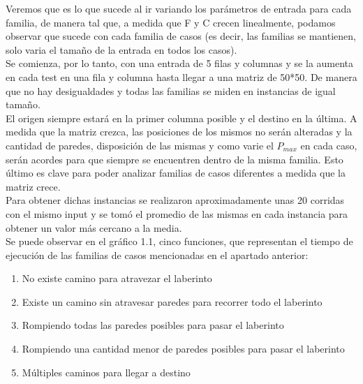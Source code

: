 \indent Veremos que es lo que sucede al ir variando los parámetros de entrada para cada familia, de manera tal que, a medida que F y C crecen linealmente, podamos observar que sucede con cada familia de casos (es decir, las familias se mantienen, solo varia el tamaño de la entrada en todos los casos).\\
Se comienza, por lo tanto, con una entrada de 5 filas y columnas y se la aumenta en cada test en una fila y columna hasta llegar a una matriz de 50*50. De manera que no hay desigualdades y todas las familias se miden en instancias de igual tamaño.\\
El origen siempre estará en la primer columna posible y el destino en la última. A medida que la matriz crezca, las posiciones de los mismos no serán alteradas y la cantidad de paredes, disposición de las mismas y como varie el $P_{max}$ en cada caso, serán acordes para que siempre se encuentren dentro de la misma familia. Esto último es clave para poder analizar familias de casos diferentes a medida que la matriz crece.\\

Para obtener dichas instancias se realizaron aproximadamente unas 20 corridas con el mismo input y se tom\'o el promedio de las mismas en cada instancia para obtener un valor m\'as cercano a la media.\\ 

Se puede observar en el  gráfico 1.1, cinco funciones, que representan el tiempo de ejecuci\'on de las familias de casos mencionadas en el apartado anterior:\\

\begin{enumerate}
\item No existe camino para atravezar el laberinto
\item Existe un camino sin atravesar paredes para recorrer todo el laberinto
\item Rompiendo todas las paredes posibles para pasar el laberinto
\item Rompiendo una cantidad menor de paredes posibles para pasar el laberinto
\item Múltiples caminos para llegar a destino
\end{enumerate}

